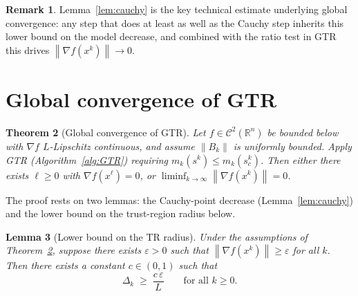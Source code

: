 \documentclass[11pt,a4paper]{report}
\theoremstyle{plain}
\newtheorem{theorem}{Theorem}[chapter]
\newtheorem{lemma}[theorem]{Lemma}
\theoremstyle{definition}
\newtheorem{remark}[theorem]{Remark}
\newcommand{\R}{\mathbb{R}}
\newcommand{\norm}[1]{\left\lVert#1\right\rVert}
\newcommand{\grad}{\nabla}
\newcommand{\eps}{\varepsilon}
\begin{document}
\begin{remark}
Lemma~\ref{lem:cauchy} is the key technical estimate underlying global
convergence: any step that does at least as well as the Cauchy step inherits
this lower bound on the model decrease, and combined with the ratio test in
GTR this drives $\norm{\grad f(x^{k})}\to 0$.
\end{remark}

\section{Global convergence of GTR}

\begin{theorem}[Global convergence of GTR]\label{thm:GTR-global}
Let $f\in\mathcal{C}^{2}(\R^{n})$ be bounded below with $\grad f$ $L$-Lipschitz continuous, and assume $\norm{B_{k}}$ is uniformly bounded. Apply GTR
(Algorithm~\ref{alg:GTR}) requiring $m_{k}(s^{k})\le m_{k}(s^{k}_{c})$. Then either
there exists $\ell\ge 0$ with $\grad f(x^{\ell})=0$, or
$\liminf_{k\to\infty}\norm{\grad f(x^{k})}=0$.
\end{theorem}
  
\medskip
The proof rests on two lemmas: the Cauchy-point decrease (Lemma~\ref{lem:cauchy})
and the lower bound on the trust-region radius below.
  
\begin{lemma}[Lower bound on the TR radius]\label{lem:tr-radius}
Under the assumptions of Theorem~\ref{thm:GTR-global}, suppose there exists
$\eps>0$ such that $\norm{\grad f(x^{k})}\ge\eps$ for all $k$. Then there
exists a constant $c\in(0,1)$ such that
\[
\Delta_{k}\;\ge\;\frac{c\,\eps}{L}\qquad\text{for all }k\ge 0.
\]
\end{lemma}
\end{document}
